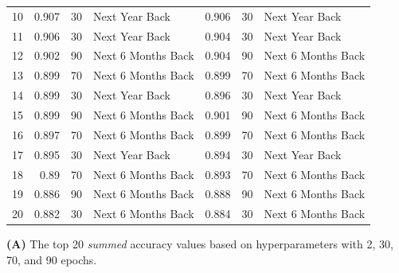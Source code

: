 \documentclass[utf8]{FrontiersinVancouver} %
\begin{document}
\begin{table}[htb]
\begin{center}
{\begin{tabular}{|l||r|r|l|r|r|l|}
10  &  0.907 &     30 &      Next Year Back &  0.906 &     30 &      Next Year Back \\
11  &  0.906 &     30 &      Next Year Back &  0.904 &     30 &      Next Year Back \\
12  &  0.902 &     90 &  Next 6 Months Back &  0.904 &     90 &  Next 6 Months Back \\
13  &  0.899 &     70 &  Next 6 Months Back &  0.899 &     70 &  Next 6 Months Back \\
14  &  0.899 &     30 &      Next Year Back &  0.896 &     30 &      Next Year Back \\
15  &  0.899 &     90 &  Next 6 Months Back &  0.901 &     90 &  Next 6 Months Back \\
16  &  0.897 &     70 &  Next 6 Months Back &  0.899 &     70 &  Next 6 Months Back \\
17  &  0.895 &     30 &      Next Year Back &  0.894 &     30 &      Next Year Back \\
18  &  0.89 &     70 &  Next 6 Months Back &  0.893 &     70 &  Next 6 Months Back \\
19  &  0.886 &     90 &  Next 6 Months Back &  0.888 &     90 &  Next 6 Months Back \\
20  &  0.882 &     30 &  Next 6 Months Back &  0.884 &     30 &  Next 6 Months Back \\

        \hline
        \end{tabular}
        }
        \end{center}
        
        {\bf (A)} The top 20 {\em summed} accuracy values based on hyperparameters with 2, 30, 70, and 90 epochs.\


\end{table}
\end{document}
